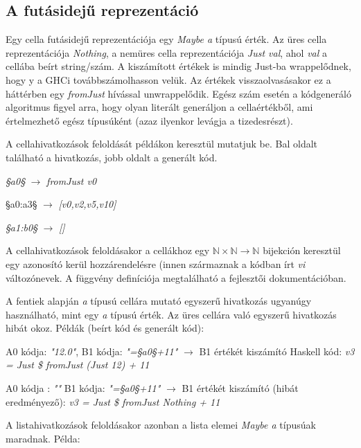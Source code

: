 \subsection{A futásidejű reprezentáció}

Egy cella futásidejű reprezentációja egy \textit{Maybe a} típusú érték. Az üres cella reprezentációja \textit{Nothing}, a nemüres cella reprezentációja \textit{Just val}, ahol \textit{val} a cellába beírt string/szám. A kiszámított értékek is mindig Just-ba wrappelődnek, hogy y a GHCi továbbszámolhasson velük. Az értékek visszaolvasásakor ez a háttérben egy \textit{fromJust} hívással unwrappelődik.
Egész szám esetén a kódgeneráló algoritmus figyel arra, hogy olyan literált generáljon a cellaértékből, ami értelmezhető egész típusúként (azaz ilyenkor levágja a tizedesrészt).

A cellahivatkozások feloldását példákon keresztül mutatjuk be. Bal oldalt található a hivatkozás, jobb oldalt a generált kód.
\begin{compactenum}
	\item \textit{§a0§} $\rightarrow$ \textit{fromJust v0}
	\item §a0:a3§ $\rightarrow$ \textit{[v0,v2,v5,v10]}
	\item \textit{§a1:b0§} $\rightarrow$ \textit{[]}
\end{compactenum}

A cellahivatkozások feloldásakor a cellákhoz egy $\mathbb{N} \times \mathbb{N} \rightarrow \mathbb{N}$ bijekción keresztül egy azonosító kerül hozzárendelésre (innen származnak a kódban írt \textit{vi} változónevek. A függvény definíciója megtalálható a fejlesztői dokumentációban.

A fentiek alapján \textit{a} típusú cellára mutató egyszerű hivatkozás ugyanúgy használható, mint egy \textit{a} típusú érték. Az üres cellára való egyszerű hivatkozás hibát okoz. Példák (beírt kód és generált kód):
\begin{compactenum}
	\item A0 kódja: \textit{"12.0"}, B1 kódja: \textit{"=§a0§+11"} $\rightarrow$ B1 értékét kiszámító Haskell kód: \textit{v3 = Just \$ fromJust (Just 12) + 11}
	\item A0 kódja : \textit{""} B1 kódja: \textit{"=§a0§+11"} $\rightarrow$ B1 értékét kiszámító (hibát eredményező): \textit{v3 = Just \$ fromJust Nothing + 11}
\end{compactenum}

A listahivatkozások feloldásakor azonban a lista elemei \textit{Maybe a} típusúak maradnak. Példa:

